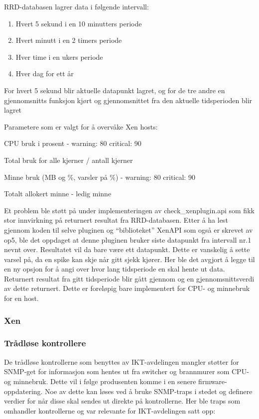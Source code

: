 RRD-databasen lagrer data i følgende intervall:
\begin{enumerate}
	\item Hvert 5 sekund i en 10 minutters periode
	\item Hvert minutt i en 2 timers periode
	\item Hver time i en ukers periode
	\item Hver dag for ett år
\end{enumerate}

For hvert 5 sekund blir aktuelle datapunkt lagret, og for de tre andre en gjennomsnitts funksjon kjørt og gjennomsnittet fra den aktuelle tidsperioden blir lagret 

Parametere som er valgt for å overvåke Xen hosts:

CPU bruk i prosent - warning: 80 critical: 90 

Total bruk for alle kjerner / antall kjerner

Minne bruk (MB og \%, varsler på \%) - warning: 80 critical: 90

Totalt allokert minne - ledig minne 

Et problem ble støtt på under implementeringen av check\_xenplugin.api som fikk stor innvirkning på returnert resultat fra RRD-databasen. Etter å ha lest gjennom koden til selve pluginen og “biblioteket” XenAPI som også er skrevet av op5, ble det oppdaget at denne pluginen bruker siste datapunkt fra intervall nr.1 nevnt over. Resultatet vil da bare være ett datapunkt. Dette er vanskelig å sette varsel på, da en spike kan skje når gitt sjekk kjører. Her ble det avgjort å legge til en ny opsjon for å angi over hvor lang tidsperiode en skal hente ut data. Returnert resultat fra gitt tidsperiode blir gått gjennom og en gjennomsnittsverdi av dette returnert. Dette er foreløpig bare implementert for CPU- og minnebruk for en host.

\subsubsection{Xen}


\subsubsection{Trådløse kontrollere}

De trådløse kontrollerne som benyttes av IKT-avdelingen mangler støtter for SNMP-get for informasjon som hentes ut fra switcher og brannmurer som  CPU- og minnebruk. Dette vil i følge produsenten komme i en senere firmware-oppdatering.
Noe av dette kan løses ved å bruke SNMP-traps i stedet og definere verdier for når disse skal sendes ut direkte på kontrollerne. Her ble traps som omhandler kontrollerne og var relevante for IKT-avdelingen satt opp:


